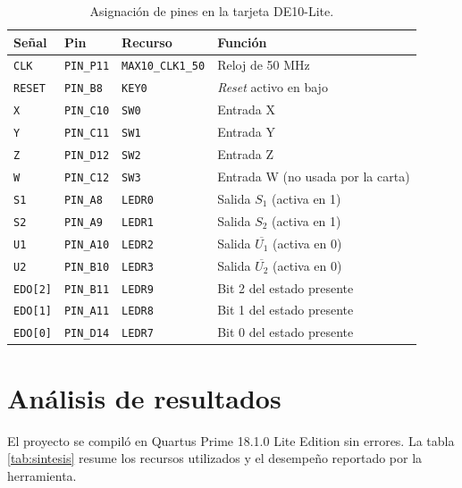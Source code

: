 \begin{table}[H]
  \centering
  \caption{Asignación de pines en la tarjeta DE10-Lite.}
  \label{tab:pines}
  \small
  \begin{tabular}{@{}l l l l@{}}
    \toprule
    \textbf{Señal} & \textbf{Pin} & \textbf{Recurso} & \textbf{Función} \\
    \midrule
    \texttt{CLK}     & \texttt{PIN\_P11} & \texttt{MAX10\_CLK1\_50} & Reloj de 50 MHz \\
    \texttt{RESET}   & \texttt{PIN\_B8}  & \texttt{KEY0}   & \textit{Reset} activo en bajo \\
    \texttt{X}       & \texttt{PIN\_C10} & \texttt{SW0}    & Entrada X \\
    \texttt{Y}       & \texttt{PIN\_C11} & \texttt{SW1}    & Entrada Y \\
    \texttt{Z}       & \texttt{PIN\_D12} & \texttt{SW2}    & Entrada Z \\
    \texttt{W}       & \texttt{PIN\_C12} & \texttt{SW3}    & Entrada W (no usada por la carta) \\
    \texttt{S1}      & \texttt{PIN\_A8}  & \texttt{LEDR0}  & Salida $S_1$ (activa en 1) \\
    \texttt{S2}      & \texttt{PIN\_A9}  & \texttt{LEDR1}  & Salida $S_2$ (activa en 1) \\
    \texttt{U1}      & \texttt{PIN\_A10} & \texttt{LEDR2}  & Salida $\overline{U_1}$ (activa en 0) \\
    \texttt{U2}      & \texttt{PIN\_B10} & \texttt{LEDR3}  & Salida $\overline{U_2}$ (activa en 0) \\
    \texttt{EDO[2]}  & \texttt{PIN\_B11} & \texttt{LEDR9}  & Bit 2 del estado presente \\
    \texttt{EDO[1]}  & \texttt{PIN\_A11} & \texttt{LEDR8}  & Bit 1 del estado presente \\
    \texttt{EDO[0]}  & \texttt{PIN\_D14} & \texttt{LEDR7}  & Bit 0 del estado presente \\
    \bottomrule
  \end{tabular}
\end{table}

\section{Análisis de resultados}

El proyecto se compiló en Quartus Prime 18.1.0 Lite Edition sin errores. La tabla
\ref{tab:sintesis} resume los recursos utilizados y el desempeño reportado por la herramienta.

